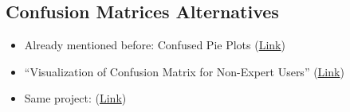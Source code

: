 \documentclass[12pt,a4paper]{article}
\begin{document}
\subsection{Confusion Matrices Alternatives}
\begin{itemize}
\item Already mentioned before: Confused Pie Plots (\href{http://www.dietergalea.com/confusion-matrices-alternative/}{Link})
\item ``Visualization of Confusion Matrix for Non-Expert Users'' (\href{https://pdfs.semanticscholar.org/1e04/b2882ddd6e07f411e3a77d9d20bdd21273a8.pdf}{Link})
\item Same project: (\href{https://www.researchgate.net/publication/302412429_Simplifying_the_Visualization_of_Confusion_Matrix}{Link}) 
\begin{description}

\end{description}
\end{itemize}
\end{document}
